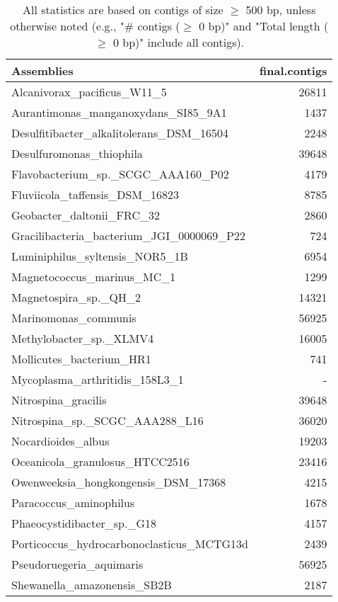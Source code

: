 \documentclass[12pt,a4paper]{article}
\begin{document}
\begin{table}[ht]
\begin{center}
\caption{All statistics are based on contigs of size $\geq$ 500 bp, unless otherwise noted (e.g., "\# contigs ($\geq$ 0 bp)" and "Total length ($\geq$ 0 bp)" include all contigs).}
\begin{tabular}{|l*{1}{|r}|}
\hline
Assemblies & final.contigs \\ \hline
Alcanivorax\_pacificus\_W11\_5 & 26811 \\ \hline
Aurantimonas\_manganoxydans\_SI85\_9A1 & 1437 \\ \hline
Desulfitibacter\_alkalitolerans\_DSM\_16504 & 2248 \\ \hline
Desulfuromonas\_thiophila & 39648 \\ \hline
Flavobacterium\_sp.\_SCGC\_AAA160\_P02 & 4179 \\ \hline
Fluviicola\_taffensis\_DSM\_16823 & 8785 \\ \hline
Geobacter\_daltonii\_FRC\_32 & 2860 \\ \hline
Gracilibacteria\_bacterium\_JGI\_0000069\_P22 & 724 \\ \hline
Luminiphilus\_syltensis\_NOR5\_1B & 6954 \\ \hline
Magnetococcus\_marinus\_MC\_1 & 1299 \\ \hline
Magnetospira\_sp.\_QH\_2 & 14321 \\ \hline
Marinomonas\_communis & 56925 \\ \hline
Methylobacter\_sp.\_XLMV4 & 16005 \\ \hline
Mollicutes\_bacterium\_HR1 & 741 \\ \hline
Mycoplasma\_arthritidis\_158L3\_1 & - \\ \hline
Nitrospina\_gracilis & 39648 \\ \hline
Nitrospina\_sp.\_SCGC\_AAA288\_L16 & 36020 \\ \hline
Nocardioides\_albus & 19203 \\ \hline
Oceanicola\_granulosus\_HTCC2516 & 23416 \\ \hline
Owenweeksia\_hongkongensis\_DSM\_17368 & 4215 \\ \hline
Paracoccus\_aminophilus & 1678 \\ \hline
Phaeocystidibacter\_sp.\_G18 & 4157 \\ \hline
Porticoccus\_hydrocarbonoclasticus\_MCTG13d & 2439 \\ \hline
Pseudoruegeria\_aquimaris & 56925 \\ \hline
Shewanella\_amazonensis\_SB2B & 2187 \\ \hline

\end{tabular}
\end{center}
\end{table}
\end{document}
